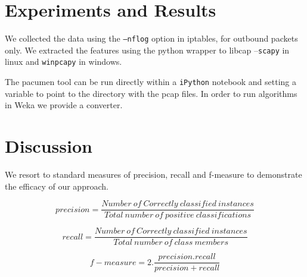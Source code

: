 \section{Experiments and Results}
We collected the data using the {\tt --nflog} option in iptables, for outbound packets only. 
We extracted the features using the python wrapper to libcap --{\tt scapy} in linux and {\tt winpcapy} in windows.  

The pacumen tool can be run directly within a {\tt iPython} notebook and setting a variable to point to the directory with the pcap files. 
In order to run algorithms in Weka\cite{hall2009weka} we provide a converter. 
\section{Discussion}


We resort to standard measures of precision, recall and f-measure to
demonstrate the efficacy of our approach.

\[precision = \frac{Number\ of\ Correctly\ classified\ instances}{Total\ number\ of\  positive\ classifications}\]


\[recall = \frac{Number\ of\ Correctly\ classified\ instances}{Total\ number\ of\ class\ members}\]

\[f-measure = 2 . \frac{precision.recall}{precision + recall}\]


